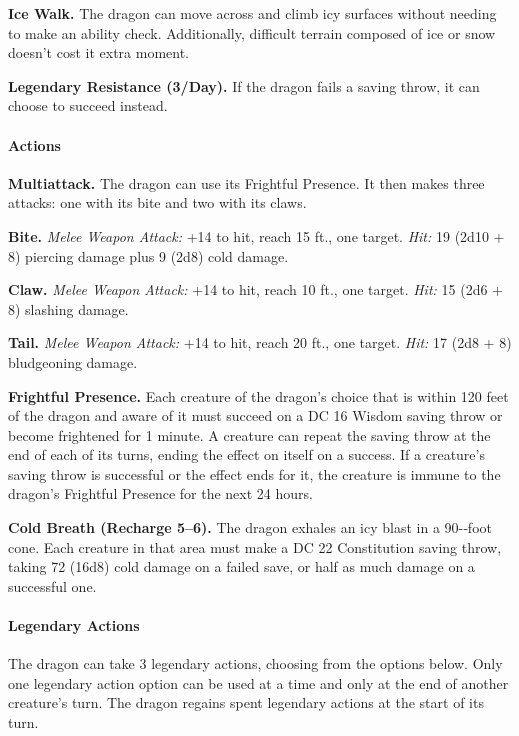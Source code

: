 \documentclass[
]{article}
\begin{document}
\textbf{Ice Walk.} The dragon can move across and climb icy surfaces
without needing to make an ability check. Additionally, difficult
terrain composed of ice or snow doesn't cost it extra moment.

\textbf{Legendary Resistance (3/Day).} If the dragon fails a saving
throw, it can choose to succeed instead.

\hypertarget{actions-39}{%
\paragraph{Actions}\label{actions-39}}

\textbf{Multiattack.} The dragon can use its Frightful Presence. It then
makes three attacks: one with its bite and two with its claws.

\textbf{Bite.} \emph{Melee Weapon Attack:} +14 to hit, reach 15 ft., one
target. \emph{Hit:} 19 (2d10 + 8) piercing damage plus 9 (2d8) cold
damage.

\textbf{Claw.} \emph{Melee Weapon Attack:} +14 to hit, reach 10 ft., one
target. \emph{Hit:} 15 (2d6 + 8) slashing damage.

\textbf{Tail.} \emph{Melee Weapon Attack:} +14 to hit, reach 20 ft., one
target. \emph{Hit:} 17 (2d8 + 8) bludgeoning damage.

\textbf{Frightful Presence.} Each creature of the dragon's choice that
is within 120 feet of the dragon and aware of it must succeed on a DC 16
Wisdom saving throw or become frightened for 1 minute. A creature can
repeat the saving throw at the end of each of its turns, ending the
effect on itself on a success. If a creature's saving throw is
successful or the effect ends for it, the creature is immune to the
dragon's Frightful Presence for the next 24 hours.

\textbf{Cold Breath (Recharge 5--6).} The dragon exhales an icy blast in
a 90-­‐foot cone. Each creature in that area must make a DC 22
Constitution saving throw, taking 72 (16d8) cold damage on a failed
save, or half as much damage on a successful one.

\hypertarget{legendary-actions-8}{%
\paragraph{Legendary Actions}\label{legendary-actions-8}}

The dragon can take 3 legendary actions, choosing from the options
below. Only one legendary action option can be used at a time and only
at the end of another creature's turn. The dragon regains spent
legendary actions at the start of its turn.
\end{document}
